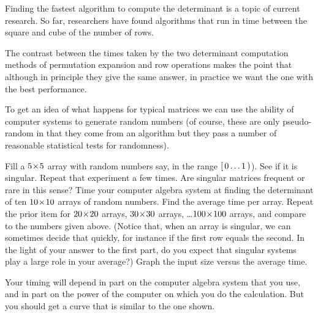 Finding the fastest algorithm to compute the determinant 
is a topic of current research.
So far, researchers have found algorithms that run in time between the 
square and cube of the number of rows.

The contrast between the times taken by the two determinant computation
methods of permutation expansion and row operations 
makes the point that although in principle they give the same answer, 
in practice we want the one with the best performance.


\begin{exercises}
  \item 
    To get an idea of what happens for typical matrices
    we can use the ability of computer systems to generate random numbers
    (of course, these are only pseudo-random in that they come from
    an algorithm but they 
    pass a number of reasonable statistical tests for randomness).
    \begin{exparts}
      \partsitem Fill a $5 \! \times \! 5$ array with random numbers say, in the
        range $[\,0\ldots 1\,)$).
        See if it is singular.
        Repeat that experiment a few times.
        Are singular matrices frequent or rare in this sense?
      \partsitem Time your computer algebra system at finding the
        determinant of ten $10 \! \times \! 10$ arrays of random numbers.
        Find the average time per array.
        Repeat the prior item for $20 \! \times \! 20$ arrays,
        $30 \! \times \! 30$ arrays, \ldots $100 \! \times \! 100$ arrays, 
        and compare to the numbers given above.
        (Notice that, when an array is singular, we can sometimes decide that
        quickly,
        for instance if the first row equals the second.
        In the light of your answer to the first part, do you expect that 
        singular systems play a large role in your average?)
      \partsitem Graph the input size versus the average time.
    \end{exparts}
    \begin{answer}
      Your timing will depend in part on the computer algebra system
      that you use, and in part on the power of the computer on which
      you do the calculation.
      But you should get a curve that is similar to the one shown.


\end{answer}
\end{exercises}

